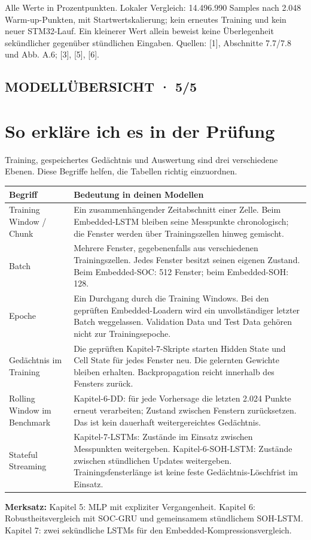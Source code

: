 \documentclass[11pt,a4paper]{article}
\begin{document}
Alle Werte in Prozentpunkten. Lokaler Vergleich: 14.496.990 Samples nach 2.048 Warm-up-Punkten, mit Startwertskalierung; kein erneutes Training und kein neuer STM32-Lauf. Ein kleinerer Wert allein beweist keine Überlegenheit sekündlicher gegenüber stündlichen Eingaben. Quellen: [1], Abschnitte 7.7/\allowbreak{}7.8 und Abb. A.6; [3], [5], [6].


\clearpage
\subsection*{MODELLÜBERSICHT · 5/\allowbreak{}5}
\section*{\color{accent}So erkläre ich es in der Prüfung}
Training, gespeichertes Gedächtnis und Auswertung sind drei verschiedene Ebenen. Diese Begriffe helfen, die Tabellen richtig einzuordnen.

{\fontsize{9.5}{12}\selectfont\setlength{\tabcolsep}{2mm}\renewcommand{\arraystretch}{1.2}\begin{longtable}{>{\raggedright\arraybackslash}p{35.79mm}>{\raggedright\arraybackslash}p{126.21mm}}
\toprule
\textbf{Begriff} & \textbf{Bedeutung in deinen Modellen} \\
\midrule\endhead
Training Window /\allowbreak{} Chunk & Ein zusammenhängender Zeitabschnitt einer Zelle. Beim Embedded-LSTM bleiben seine Messpunkte chronologisch; die Fenster werden über Trainingszellen hinweg gemischt. \\
Batch & Mehrere Fenster, gegebenenfalls aus verschiedenen Trainingszellen. Jedes Fenster besitzt seinen eigenen Zustand. Beim Embedded-SOC: 512 Fenster; beim Embedded-SOH: 128. \\
Epoche & Ein Durchgang durch die Training Windows. Bei den geprüften Embedded-Loadern wird ein unvollständiger letzter Batch weggelassen. Validation Data und Test Data gehören nicht zur Trainingsepoche. \\
Gedächtnis im Training & Die geprüften Kapitel-7-Skripte starten Hidden State und Cell State für jedes Fenster neu. Die gelernten Gewichte bleiben erhalten. Backpropagation reicht innerhalb des Fensters zurück. \\
Rolling Window im Benchmark & Kapitel-6-DD: für jede Vorhersage die letzten 2.024 Punkte erneut verarbeiten; Zustand zwischen Fenstern zurücksetzen. Das ist kein dauerhaft weitergereichtes Gedächtnis. \\
Stateful Streaming & Kapitel-7-LSTMs: Zustände im Einsatz zwischen Messpunkten weitergeben. Kapitel-6-SOH-LSTM: Zustände zwischen stündlichen Updates weitergeben. Trainingsfensterlänge ist keine feste Gedächtnis-Löschfrist im Einsatz. \\
\bottomrule
\end{longtable}}
\textbf{Merksatz:} Kapitel 5: MLP mit expliziter Vergangenheit. Kapitel 6: Robustheitsvergleich mit SOC-GRU und gemeinsamem stündlichem SOH-LSTM. Kapitel 7: zwei sekündliche LSTMs für den Embedded-Kompressionsvergleich.
\end{document}
